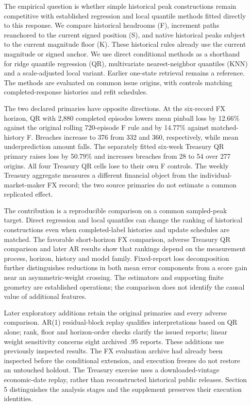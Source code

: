 \documentclass[10pt,a4paper]{article}
\begin{document}
The empirical question is whether simple historical peak constructions remain competitive with established regression and local quantile methods fitted directly to this response. We compare historical headrooms (F), increment paths reanchored to the current signed position (S), and native historical peaks subject to the current magnitude floor (K). These historical rules already use the current magnitude or signed anchor. We use direct conditional methods as a shorthand for ridge quantile regression (QR), multivariate nearest-neighbor quantiles (KNN) and a scale-adjusted local variant. Earlier one-state retrieval remains a reference. The methods are evaluated on common issue origins, with controls matching completed-response histories and refit schedules.

The two declared primaries have opposite directions. At the six-record FX horizon, QR with 2,880 completed episodes lowers mean pinball loss by 12.66\% against the original rolling 720-episode F rule and by 14.77\% against matched-history F. Breaches increase to 376 from 332 and 360, respectively, while mean underprediction amount falls. The separately fitted six-week Treasury QR primary raises loss by 50.79\% and increases breaches from 28 to 54 over 277 origins. All four Treasury QR cells lose to their own F controls. The weekly Treasury aggregate measures a different financial object from the individual-market-maker FX record; the two source primaries do not estimate a common replicated effect.

The contribution is a reproducible comparison on a common sampled-peak target. Direct regression and local quantiles can change the ranking of historical constructions even when completed-label histories and update schedules are matched. The favorable short-horizon FX comparison, adverse Treasury QR comparison and later AR results show that rankings depend on the measurement process, horizon, history and model family. Fixed-report loss decomposition further distinguishes reductions in both mean error components from a score gain near an asymmetric-weight crossing. The estimators and supporting finite geometry are established operations; the comparison does not identify the causal value of additional features.

Later exploratory additions retain the original primaries and every adverse comparison. AR(1) residual-block replay qualifies interpretations based on QR alone; rank, floor and horizon-order checks clarify the issued reports; linear weight sensitivity concerns eight archived .95 reports. These additions use previously inspected results. The FX evaluation archive had already been inspected before the conditional extension, and execution freezes do not restore an untouched holdout. The Treasury exercise uses a downloaded-vintage economic-date replay, rather than reconstructed historical public releases. Section 5 distinguishes the analysis stages and the supplement preserves their execution identities.
\end{document}
